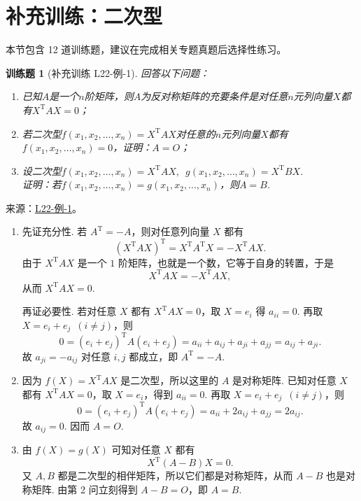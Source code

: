 \documentclass[UTF8,12pt,a4paper,fontset=fandol]{ctexart}
\newtheorem{exercise}{训练题}[section]
\begin{document}
\section{补充训练：二次型}

本节包含 12 道训练题，建议在完成相关专题真题后选择性练习。

\begin{exercise}[补充训练 L22-例-1]\label{prob:L22-例-1}
回答以下问题：
    \begin{enumerate}
        \item 已知$A$是一个$n$阶矩阵，则$A$为反对称矩阵的充要条件是对任意$n$元列向量$X$都有$X^\mathrm{T}AX=0$；

        \item 若二次型$f(x_1,x_2,\ldots,x_n)=X^\mathrm{T}AX$对任意的$n$元列向量$X$都有$f(x_1,x_2,\ldots,x_n)=0$，证明：$A=O$；

        \item 设二次型$f(x_1,x_2,\ldots,x_n)=X^\mathrm{T}AX,\enspace g(x_1,x_2,\ldots,x_n)=X^\mathrm{T}BX$.\\
              证明：若$f(x_1,x_2,\ldots,x_n)=g(x_1,x_2,\ldots,x_n)$，则$A=B$.
    \end{enumerate}
\end{exercise}
\noindent 来源：\href{https://github.com/yhwu-is/Linear-Algebra-Left-Undone/blob/new/%E8%AE%B2%E4%B9%89/%E4%B8%93%E9%A2%98/22%20%E4%BA%8C%E6%AC%A1%E5%9E%8B.tex}{L22-例-1}。
\begin{solve}
\begin{enumerate}
        \item 先证充分性. 若 $A^\mathrm{T}=-A$，则对任意列向量 $X$ 都有
              \[
                  (X^\mathrm{T}AX)^\mathrm{T}=X^\mathrm{T}A^\mathrm{T}X=-X^\mathrm{T}AX.
              \]
              由于 $X^\mathrm{T}AX$ 是一个 $1$ 阶矩阵，也就是一个数，它等于自身的转置，于是
              \[
                  X^\mathrm{T}AX=-X^\mathrm{T}AX,
              \]
              从而 $X^\mathrm{T}AX=0$.

              再证必要性. 若对任意 $X$ 都有 $X^\mathrm{T}AX=0$，取 $X=e_i$ 得 $a_{ii}=0$. 再取 $X=e_i+e_j\enspace(i\neq j)$，则
              \[
                  0=(e_i+e_j)^\mathrm{T}A(e_i+e_j)=a_{ii}+a_{ij}+a_{ji}+a_{jj}=a_{ij}+a_{ji}.
              \]
              故 $a_{ji}=-a_{ij}$ 对任意 $i,j$ 都成立，即 $A^\mathrm{T}=-A$.

        \item 因为 $f(X)=X^\mathrm{T}AX$ 是二次型，所以这里的 $A$ 是对称矩阵. 已知对任意 $X$ 都有 $X^\mathrm{T}AX=0$，取 $X=e_i$，得到 $a_{ii}=0$. 再取 $X=e_i+e_j\enspace(i\neq j)$，则
              \[
                  0=(e_i+e_j)^\mathrm{T}A(e_i+e_j)=a_{ii}+2a_{ij}+a_{jj}=2a_{ij}.
              \]
              故 $a_{ij}=0$. 因而 $A=O$.

        \item 由 $f(X)=g(X)$ 可知对任意 $X$ 都有
              \[
                  X^\mathrm{T}(A-B)X=0.
              \]
              又 $A,B$ 都是二次型的相伴矩阵，所以它们都是对称矩阵，从而 $A-B$ 也是对称矩阵. 由第 2 问立刻得到 $A-B=O$，即 $A=B$.
    \end{enumerate}
\end{solve}
\end{document}
